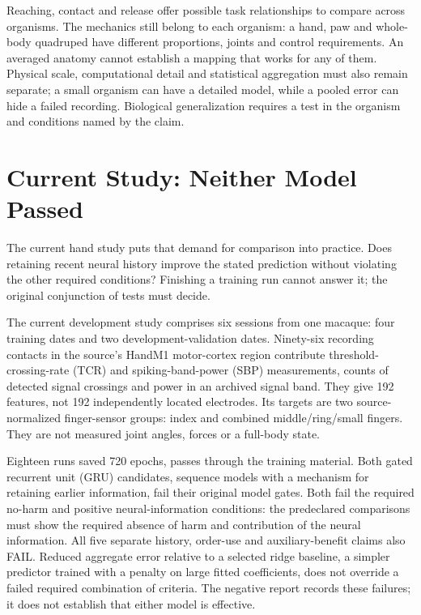 Reaching, contact and release offer possible task relationships to compare across organisms. The mechanics still belong to each organism: a hand, paw and whole-body quadruped have different proportions, joints and control requirements. An averaged anatomy cannot establish a mapping that works for any of them. Physical scale, computational detail and statistical aggregation must also remain separate; a small organism can have a detailed model, while a pooled error can hide a failed recording. Biological generalization requires a test in the organism and conditions named by the claim.\par

\section{Current Study: Neither Model Passed}

The current hand study puts that demand for comparison into practice. Does
retaining recent neural history improve the stated prediction without
violating the other required conditions? Finishing a training run cannot
answer it; the original conjunction of tests must decide.\par

The current development study comprises six sessions from one macaque: four training dates and two development-validation dates. Ninety-six recording contacts in the source's HandM1 motor-cortex region contribute threshold-crossing-rate (TCR) and spiking-band-power (SBP) measurements, counts of detected signal crossings and power in an archived signal band. They give 192 features, not 192 independently located electrodes. Its targets are two source-normalized finger-sensor groups: index and combined middle/ring/small fingers. They are not measured joint angles, forces or a full-body state.\par

Eighteen runs saved 720 epochs, passes through the training material. Both gated recurrent unit (GRU) candidates, sequence models with a mechanism for retaining earlier information, fail their original model gates. Both fail the required no-harm and positive neural-information conditions: the predeclared comparisons must show the required absence of harm and contribution of the neural information. All five separate history, order-use and auxiliary-benefit claims also FAIL. Reduced aggregate error relative to a selected ridge baseline, a simpler predictor trained with a penalty on large fitted coefficients, does not override a failed required combination of criteria. The negative report records these failures; it does not establish that either model is effective.\par

